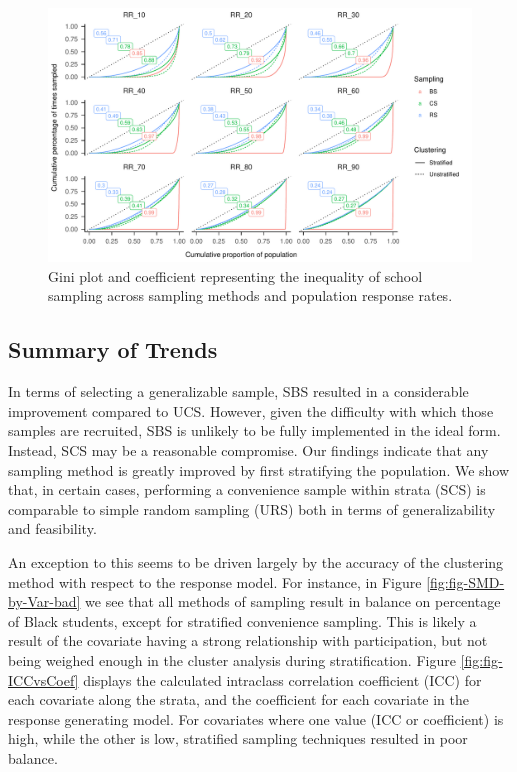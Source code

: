 \documentclass[man,floatsintext]{apa6}
\begin{document}
\begin{figure}
\includegraphics{GenSamp-Paper_files/figure-latex/fig-gini-curve-1} \caption{Gini plot and coefficient representing the inequality of school sampling across sampling methods and population response rates.}\label{fig:fig-gini-curve}
\end{figure}

\hypertarget{summary-of-trends}{%
\subsection{Summary of Trends}\label{summary-of-trends}}

In terms of selecting a generalizable sample, SBS resulted in a considerable improvement compared to UCS. However, given the difficulty with which those samples are recruited, SBS is unlikely to be fully implemented in the ideal form. Instead, SCS may be a reasonable compromise. Our findings indicate that any sampling method is greatly improved by first stratifying the population. We show that, in certain cases, performing a convenience sample within strata (SCS) is comparable to simple random sampling (URS) both in terms of generalizability and feasibility.

An exception to this seems to be driven largely by the accuracy of the clustering method with respect to the response model. For instance, in Figure \ref{fig:fig-SMD-by-Var-bad} we see that all methods of sampling result in balance on percentage of Black students, except for stratified convenience sampling. This is likely a result of the covariate having a strong relationship with participation, but not being weighed enough in the cluster analysis during stratification. Figure \ref{fig:fig-ICCvsCoef} displays the calculated intraclass correlation coefficient (ICC) for each covariate along the strata, and the coefficient for each covariate in the response generating model. For covariates where one value (ICC or coefficient) is high, while the other is low, stratified sampling techniques resulted in poor balance.
\end{document}
